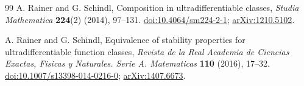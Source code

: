 \documentclass[11pt,a4paper]{article}
\theoremstyle{definition}
\theoremstyle{remark}
\numberwithin{equation}{section}
\begin{document}
\begin{thebibliography}{99}
A. Rainer and G. Schindl, Composition in ultradifferentiable classes,
\emph{Studia Mathematica} \textbf{224}(2) (2014), 97--131.
\href{https://doi.org/10.4064/sm224-2-1}{doi:10.4064/sm224-2-1};
\href{https://arxiv.org/abs/1210.5102}{arXiv:1210.5102}.

A. Rainer and G. Schindl, Equivalence of stability properties for
ultradifferentiable function classes, \emph{Revista de la Real Academia
de Ciencias Exactas, Fisicas y Naturales. Serie A. Matematicas}
\textbf{110} (2016), 17--32.
\href{https://doi.org/10.1007/s13398-014-0216-0}{doi:10.1007/s13398-014-0216-0};
\href{https://arxiv.org/abs/1407.6673}{arXiv:1407.6673}.
\end{thebibliography}
\end{document}
